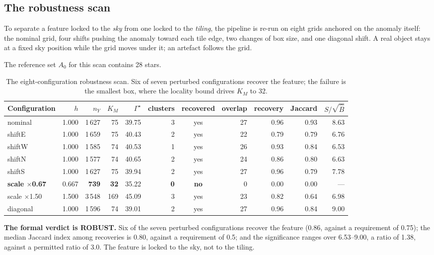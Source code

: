 \documentclass[11pt,a4paper]{article}
\newcommand{\Gstar}{\Gamma^{\star}}
\newcommand{\Bhat}{\hat{B}}
\newcommand{\srb}{S/\sqrt{\Bhat}}
\begin{document}
\subsection{The robustness scan}
\label{sec:scan}

To separate a feature locked to the \emph{sky} from one locked to the \emph{tiling}, the pipeline
is re-run on eight grids anchored on the anomaly itself: the nominal grid, four shifts pushing the
anomaly toward each tile edge, two changes of box size, and one diagonal shift. A real object stays
at a fixed sky position while the grid moves under it; an artefact follows the grid.

The reference set $A_0$ for this scan contains 28 stars.

\begin{table}[h]
\centering\footnotesize
\caption{The eight-configuration robustness scan. Six of seven perturbed configurations recover the
feature; the failure is the smallest box, where the locality bound drives $K_M$ to 32.}
\begin{tabular}{@{}lrrrrrcrrrr@{}}
\toprule
Configuration & $h$ & $n_Y$ & $K_M$ & $\Gstar$ & clusters & recovered & overlap & recovery &
Jaccard & $\srb$\\
\midrule
nominal            & 1.000 & 1\,627 & 75 & 39.75 & 3 & yes & 27 & 0.96 & 0.93 & 8.63\\
shiftE             & 1.000 & 1\,659 & 75 & 40.43 & 2 & yes & 22 & 0.79 & 0.79 & 6.76\\
shiftW             & 1.000 & 1\,585 & 74 & 40.53 & 1 & yes & 26 & 0.93 & 0.84 & 6.53\\
shiftN             & 1.000 & 1\,577 & 74 & 40.65 & 2 & yes & 24 & 0.86 & 0.80 & 6.63\\
shiftS             & 1.000 & 1\,627 & 75 & 39.94 & 2 & yes & 27 & 0.96 & 0.79 & 7.78\\
\textbf{scale $\times$0.67} & 0.667 & \textbf{739} & \textbf{32} & 35.22 & \textbf{0} &
\textbf{no} & 0 & 0.00 & 0.00 & ---\\
scale $\times$1.50 & 1.500 & 3\,548 & 169 & 45.09 & 3 & yes & 23 & 0.82 & 0.64 & 6.98\\
diagonal           & 1.000 & 1\,596 & 74 & 39.01 & 2 & yes & 27 & 0.96 & 0.84 & 9.00\\
\bottomrule
\end{tabular}
\end{table}

\textbf{The formal verdict is ROBUST.} Six of the seven perturbed configurations recover the
feature (0.86, against a requirement of 0.75); the median Jaccard index among recoveries is 0.80,
against a requirement of 0.5; and the significance ranges over 6.53--9.00, a ratio of 1.38, against
a permitted ratio of 3.0. The feature is locked to the sky, not to the tiling.
\end{document}
